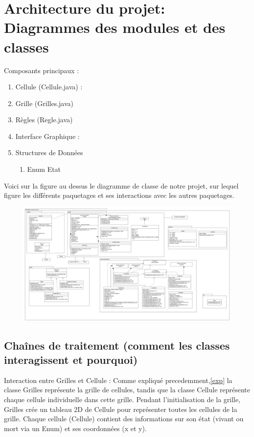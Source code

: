 \section{Architecture du projet: Diagrammes des modules et des classes}
Composants principaux :
\begin{enumerate}
    \item Cellule (Cellule.java) :
    \item Grille (Grilles.java) 
    \item Règles (Regle.java) 
    \item Interface Graphique :
    \item Structures de Données 
    \begin{enumerate}
        \item Enum Etat
    \end{enumerate} 

\end{enumerate}

\newpage
Voici sur la figure au dessus le diagramme de classe de notre projet, sur lequel figure les différents paquetages et ses interactions avec les autres paquetages.

    \begin{figure}
\begin{center}
        \includegraphics[width=120mm,scale=0.5]{figures/uml.png}
\end{center}
\end{figure}


\subsection{Chaînes de traitement (comment les classes interagissent et pourquoi)}

Interaction entre Grilles et Cellule :
Comme expliqué precedemment,\ref{exp} la classe Grilles représente la grille de cellules, tandis que la classe Cellule représente chaque cellule individuelle dans cette grille.
Pendant l'initialisation de la grille, Grilles crée un tableau 2D de Cellule pour représenter toutes les cellules de la grille.
Chaque cellule (Cellule) contient des informations sur son état (vivant ou mort via un Enum) et ses coordonnées (x et y).


